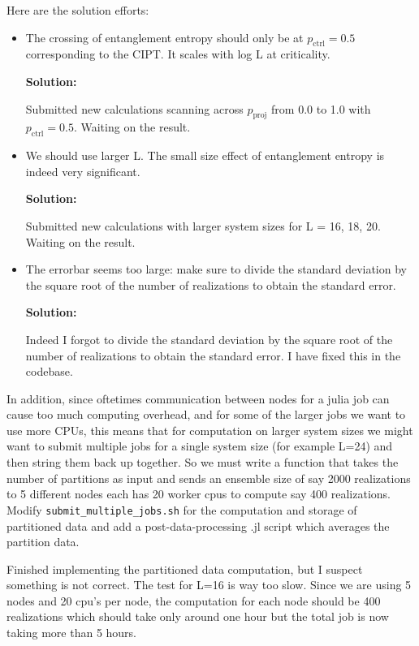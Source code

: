 \documentclass[11pt,a4paper]{article}
\begin{document}
Here are the solution efforts:

\begin{itemize}
    \item The crossing of entanglement entropy should only be at $p_\text{ctrl}=0.5$ corresponding to the CIPT. It scales with log L at criticality.

    \textbf{Solution:}

    Submitted new calculations scanning across $p_\text{proj}$ from 0.0 to 1.0 with $p_\text{ctrl}=0.5$. Waiting on the result.

    \item We should use larger L. The small size effect of entanglement entropy is indeed very significant.

    \textbf{Solution:}

    Submitted new calculations with larger system sizes for L = 16, 18, 20. Waiting on the result.

    \item The errorbar seems too large: make sure to divide the standard deviation by the square root of the number of realizations to obtain the standard error.

    \textbf{Solution:}

    Indeed I forgot to divide the standard deviation by the square root of the number of realizations to obtain the standard error. I have fixed this in the codebase.
\end{itemize}

In addition, since oftetimes communication between nodes for a julia job can cause too much computing overhead, and for some of the larger jobs we want to use more CPUs, this means that for computation on larger system sizes we might want to submit multiple jobs for a single system size (for example L=24) and then string them back up together. So we must write a function that takes the number of partitions as input and sends an ensemble size of say 2000 realizations to 5 different nodes each has 20 worker cpus to compute say 400 realizations. Modify \texttt{submit\_multiple\_jobs.sh} for the computation and storage of partitioned data and add a post-data-processing .jl script which averages the partition data.

Finished implementing the partitioned data computation, but I suspect something is not correct. The test for L=16 is way too slow. Since we are using 5 nodes and 20 cpu's per node, the computation for each node should be 400 realizations which should take only around one hour but the total job is now taking more than 5 hours. 
\end{document}
